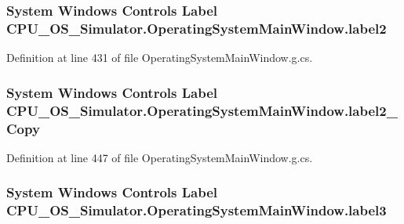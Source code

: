 \subsubsection[{label2}]{\setlength{\rightskip}{0pt plus 5cm}System Windows Controls Label C\+P\+U\+\_\+\+O\+S\+\_\+\+Simulator.\+Operating\+System\+Main\+Window.\+label2\hspace{0.3cm}{\ttfamily [package]}}\label{class_c_p_u___o_s___simulator_1_1_operating_system_main_window_a28c78c8e714c58223e338c29f89fda83}


Definition at line 431 of file Operating\+System\+Main\+Window.\+g.\+cs.

\hypertarget{class_c_p_u___o_s___simulator_1_1_operating_system_main_window_abf6d8f5cfb34c8d41580c330c6af3a51}{}
\subsubsection[{label2\+\_\+\+Copy}]{\setlength{\rightskip}{0pt plus 5cm}System Windows Controls Label C\+P\+U\+\_\+\+O\+S\+\_\+\+Simulator.\+Operating\+System\+Main\+Window.\+label2\+\_\+\+Copy\hspace{0.3cm}{\ttfamily [package]}}\label{class_c_p_u___o_s___simulator_1_1_operating_system_main_window_abf6d8f5cfb34c8d41580c330c6af3a51}


Definition at line 447 of file Operating\+System\+Main\+Window.\+g.\+cs.

\hypertarget{class_c_p_u___o_s___simulator_1_1_operating_system_main_window_a731180865f00c29a9d6affd3ba2860c1}{}
\subsubsection[{label3}]{\setlength{\rightskip}{0pt plus 5cm}System Windows Controls Label C\+P\+U\+\_\+\+O\+S\+\_\+\+Simulator.\+Operating\+System\+Main\+Window.\+label3\hspace{0.3cm}{\ttfamily [package]}}\label{class_c_p_u___o_s___simulator_1_1_operating_system_main_window_a731180865f00c29a9d6affd3ba2860c1}


